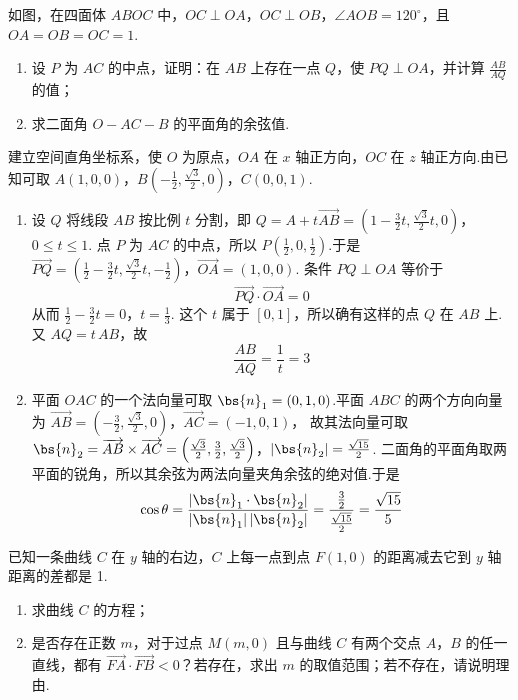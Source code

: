 \begin{problem}
如图，在四面体 \(ABOC\) 中，\(OC \perp OA\)，\(OC \perp OB\)，\(\angle AOB = 120^{\circ}\)，且 \(OA = OB = OC = 1\).

\begin{enumerate}
\item 设 \(P\) 为 \(AC\) 的中点，证明：在 \(AB\) 上存在一点 \(Q\)，使 \(PQ \perp OA\)，并计算 \(\frac{AB}{AQ}\) 的值；
\item 求二面角 \(O - AC - B\) 的平面角的余弦值.
\end{enumerate}

\end{problem}

\begin{solution}
建立空间直角坐标系，使 \(O\) 为原点，\(OA\) 在 \(x\) 轴正方向，\(OC\) 在
\(z\) 轴正方向.由已知可取
\(A(1,0,0)\)，\(B\left(-\frac12,\frac{\sqrt3}{2},0\right)\)，\(C(0,0,1)\).

\begin{enumerate}
\item 设 \(Q\) 将线段 \(AB\) 按比例 \(t\) 分割，即
\(Q=A+t\overrightarrow{AB} =\left(1-\frac32t,\frac{\sqrt3}{2}t,0\right)\)，\(0\leqslant t\leqslant1\).
点 \(P\) 为 \(AC\) 的中点，所以 \(P(\frac12,0,\frac12)\).于是
\(\overrightarrow{PQ} =\left(\frac12-\frac32t,\frac{\sqrt3}{2}t,-\frac12\right)\)，\(\overrightarrow{OA}=(1,0,0)\).
条件 \(PQ\perp OA\) 等价于
\[
\overrightarrow{PQ}\cdot\overrightarrow{OA}=0
\]
从而
\(\frac12-\frac32t=0\)，\(t=\frac13\).
这个 \(t\) 属于 \([0,1]\)，所以确有这样的点 \(Q\) 在 \(AB\) 上.又
\(AQ=t\,AB\)，故
\[
\frac{AB}{AQ}=\frac1t=3
\]

\item 平面 \(OAC\) 的一个法向量可取
\(\bs{n}_1=(0,1,0)\).平面 \(ABC\) 的两个方向向量为
\(\overrightarrow{AB}=\left(-\frac32,\frac{\sqrt3}{2},0\right)\)，\(\overrightarrow{AC}=(-1,0,1)\)，
故其法向量可取
\(\bs{n}_2=\overrightarrow{AB}\times\overrightarrow{AC} =\left(\frac{\sqrt3}{2},\frac32,\frac{\sqrt3}{2}\right)\)，\(|\bs{n}_2|=\frac{\sqrt{15}}2\).
二面角的平面角取两平面的锐角，所以其余弦为两法向量夹角余弦的绝对值.于是
\[
\cos\theta
=\frac{|\bs{n}_1\cdot\bs{n}_2|}
{|\bs{n}_1|\,|\bs{n}_2|}
=\frac{\frac{3}{2}}{\frac{\sqrt{15}}{2}}
=\frac{\sqrt{15}}5
\]
\end{enumerate}
\end{solution}

\begin{problem}
已知一条曲线 \(C\) 在 \(y\) 轴的右边，\(C\) 上每一点到点 \(F(1,0)\) 的距离减去它到 \(y\) 轴距离的差都是 1.

\begin{enumerate}
\item 求曲线 \(C\) 的方程；
\item 是否存在正数 \(m\)，对于过点 \(M(m,0)\) 且与曲线 \(C\) 有两个交点 \(A\)，\(B\) 的任一直线，都有 \(\overrightarrow{FA} \cdot \overrightarrow{FB} < 0\)？若存在，求出 \(m\) 的取值范围；若不存在，请说明理由.
\end{enumerate}
\end{problem}

